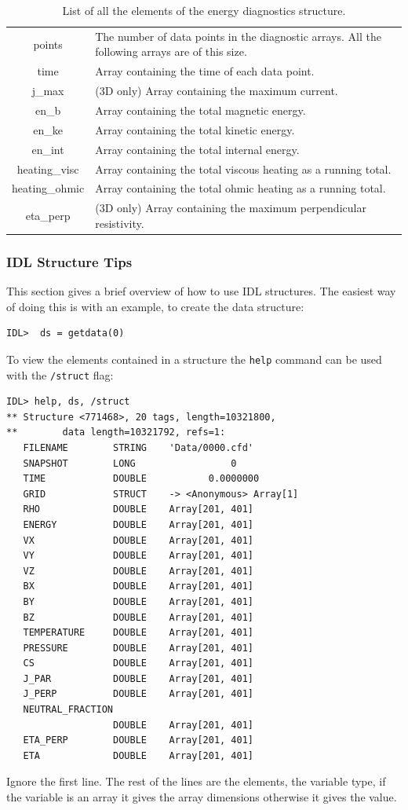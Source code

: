 \documentclass[11pt]{article}
\begin{document}
\begin{table}[!htbp]
\begin{tabular}{|c|p{}|}
\hline
points& The number of data points in the diagnostic arrays. All the following arrays are of this size.\\
time& Array containing the time of each data point.\\
j\_max& (3D only) Array containing the maximum current.\\
en\_b & Array containing the total magnetic energy.\\
en\_ke & Array containing the total kinetic energy.\\
en\_int&Array containing the total internal energy.\\
heating\_visc& Array containing the total viscous heating as a running total.\\
heating\_ohmic& Array containing the total ohmic heating as a running total.\\
eta\_perp& (3D only) Array containing the maximum perpendicular resistivity.\\
\hline
\end{tabular}
\caption{List of all the elements of the energy diagnostics structure.}
\label{enstructure}
\end{table}

\subsubsection{IDL Structure Tips}
\label{IDLtips}
This section gives a brief overview of how to use IDL structures. The easiest way of doing this is with an example, to create the data structure:
\begin{verbatim}
IDL>  ds = getdata(0)
\end{verbatim}

To view the elements contained in a structure the \texttt{help} command can be used with the \texttt{/struct} flag:
\begin{verbatim}
IDL> help, ds, /struct
** Structure <771468>, 20 tags, length=10321800, 
**        data length=10321792, refs=1:
   FILENAME        STRING    'Data/0000.cfd'
   SNAPSHOT        LONG                 0
   TIME            DOUBLE           0.0000000
   GRID            STRUCT    -> <Anonymous> Array[1]
   RHO             DOUBLE    Array[201, 401]
   ENERGY          DOUBLE    Array[201, 401]
   VX              DOUBLE    Array[201, 401]
   VY              DOUBLE    Array[201, 401]
   VZ              DOUBLE    Array[201, 401]
   BX              DOUBLE    Array[201, 401]
   BY              DOUBLE    Array[201, 401]
   BZ              DOUBLE    Array[201, 401]
   TEMPERATURE     DOUBLE    Array[201, 401]
   PRESSURE        DOUBLE    Array[201, 401]
   CS              DOUBLE    Array[201, 401]
   J_PAR           DOUBLE    Array[201, 401]
   J_PERP          DOUBLE    Array[201, 401]
   NEUTRAL_FRACTION
                   DOUBLE    Array[201, 401]
   ETA_PERP        DOUBLE    Array[201, 401]
   ETA             DOUBLE    Array[201, 401]
\end{verbatim}
Ignore the first line. The rest of the lines are the elements, the variable type, if the variable is an array it gives the array dimensions otherwise it gives the value. 
\end{document}

